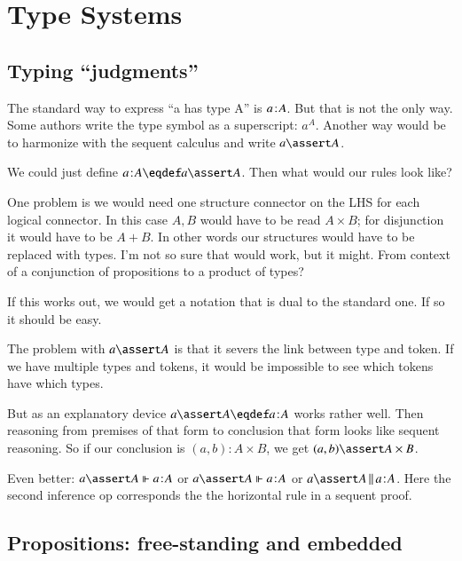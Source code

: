\section{Type Systems}\label{sec:typesystems}

\subsection{Typing ``judgments''}

The standard way to express ``a has type A'' is \(a\hspace{1pt}\mathpunct{:}\hspace{-1pt}A\). But that is
not the only way. Some authors write the type symbol as a superscript:
\(a^A\). Another way would be to harmonize with the sequent calculus
and write \(a\linfer A\).

We could just define \(\tj{a}{A}\eqdef a\linfer A\). Then what would our
rules look like?


One problem is we would need one structure connector on the LHS for
each logical connector. In this case \(A,B\) would have to be read
\(A\times B\); for disjunction it would have to be \(A\plus B\). In
other words our structures would have to be replaced with types. I'm
not so sure that would work, but it might. From context of a
conjunction of propositions to a product of types?


If this works out, we would get a notation that is dual to the
standard one. If so it should be easy.

The problem with \(a\linfer A\) is that it severs the link between type
and token. If we have multiple types and tokens, it would be
impossible to see which tokens have which types.

But as an explanatory device \(a\lso A\eqdef \tj{a}{A}\) works rather
well. Then reasoning from premises of that form to conclusion that
form looks like sequent reasoning. So if our conclusion is
\((a,b):A\times B\), we get \( (a,b)\lso A\times B\).

Even better: \(a\lso A\pso\tj{a}{A}\) or \(a\lso A\Vdash\tj{a}{A}\) or
\(a\lso A\,\Vert\,\tj{a}{A}\). Here the second inference op corresponds
the the horizontal rule in a sequent proof.

\subsection{Propositions: free-standing and embedded}

